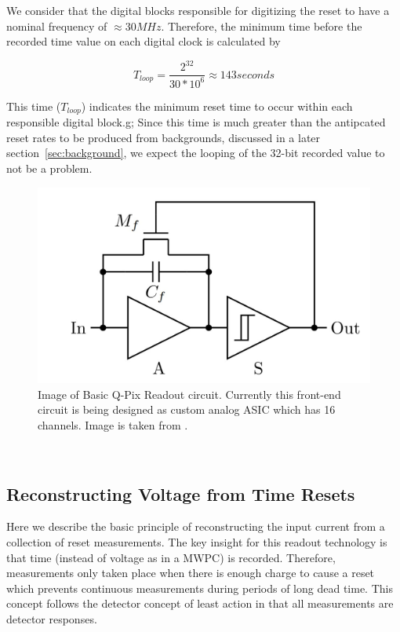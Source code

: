 We consider that the digital blocks responsible for digitizing the reset to have a nominal frequency of $\approx 30 MHz$.
Therefore, the minimum time before the recorded time value on each digital clock is calculated by

\begin{equation}
T_{loop} = \frac{2^{32}}{30*10^{6}} \approx 143 seconds
\end{equation}

This time ($T_{loop}$) indicates the minimum reset time to occur within each responsible digital block.g;
Since this time is much greater than the antipcated reset rates to be produced from backgrounds, discussed in a later section~\ref{sec:background}, we expect the looping of the 32-bit recorded value to not be a problem.

\begin{figure}[]
\centering
\includegraphics[width=\textwidth]{images/qpix_circuit.jpg}
\caption{Image of Basic Q-Pix Readout circuit. Currently this front-end circuit is being designed as custom analog ASIC which has 16 channels. Image is taken from \citep{qpix:nygren:mei}.}
\end{figure}
~\label{fig:qpixCircuit}

\subsection{Reconstructing Voltage from Time Resets}

Here we describe the basic principle of reconstructing the input current from a collection of reset measurements.
The key insight for this readout technology is that time (instead of voltage as in a MWPC) is recorded.
Therefore, measurements only taken place when there is enough charge to cause a reset which prevents continuous measurements during periods of long dead time.
This concept follows the detector concept of least action in that all measurements are detector responses.

